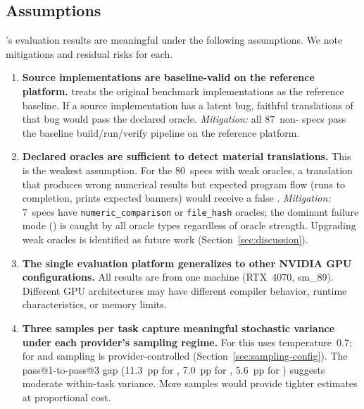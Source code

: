 \subsection{Assumptions}
\label{sec:ec-assumptions}

\parbench{}'s evaluation results are meaningful under the following assumptions.
We note mitigations and residual risks for each.

\begin{enumerate}
  \item \textbf{Source implementations are baseline-valid on the reference platform.} \parbench{}
    treats the original benchmark implementations as the reference baseline. If a source
    implementation has a latent bug, faithful translations of that bug would
    pass the declared oracle. \textit{Mitigation:} all 87~non-\knownfail{} specs pass
    the baseline build/run/verify pipeline on the reference platform.

  \item \textbf{Declared oracles are sufficient to detect material
    translations.} This is the weakest assumption. For the 80~specs with weak
    oracles, a translation that produces wrong numerical results but expected
    program flow (runs to completion, prints expected banners) would receive a
    false \pass{}. \textit{Mitigation:} 7~specs have
    \texttt{numeric\_comparison} or \texttt{file\_hash} oracles; the dominant
    failure mode (\buildfail{}) is caught by all oracle types regardless of
    oracle strength. Upgrading weak oracles is identified as future work
    (Section~\ref{sec:discussion}).

  \item \textbf{The single evaluation platform generalizes to other NVIDIA GPU
    configurations.} All results are from one machine (RTX~4070, sm\_89).
    Different GPU architectures may have different compiler behavior, runtime
    characteristics, or memory limits.
    
    \item \textbf{Three samples per task capture meaningful stochastic variance under each provider's sampling regime.} For \qwenshort{} this uses temperature~0.7; for \gptnew{} and \codex{} sampling is provider-controlled (Section~\ref{sec:sampling-config}). The pass@1-to-pass@3 gap (11.3~pp for \qwenshort{}, 7.0~pp for \gptnew{}, 5.6~pp for \codex{}) suggests moderate within-task variance. More samples would provide tighter estimates at proportional cost.
      

\end{enumerate}
